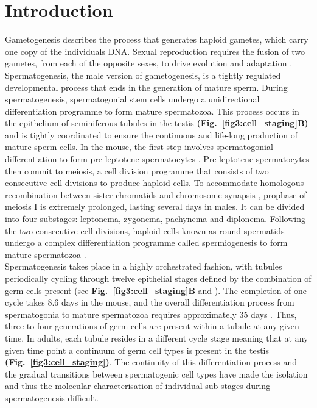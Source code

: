 
\section{Introduction}

Gametogenesis describes the process that generates haploid gametes, which carry one copy of the individuals DNA. 
Sexual reproduction requires the fusion of two gametes, from each of the opposite sexes, to drive evolution and adaptation \citep{McDonald2016}. 
Spermatogenesis, the male version of gametogenesis, is a tightly regulated developmental process that ends in the generation of mature sperm. During spermatogenesis, spermatogonial stem cells undergo a unidirectional differentiation programme to form mature spermatozoa. 
This process occurs in the epithelium of seminiferous tubules in the testis \textbf{(Fig.~\ref{fig3:cell_staging}B)} and is tightly coordinated to ensure the continuous and life-long production of mature sperm cells. 
In the mouse, the first step involves spermatogonial differentiation to form pre-leptotene spermatocytes \citep{Oakberg1971, DeRooij1973, DeRooij2000}. 
Pre-leptotene spermatocytes then commit to meiosis, a cell division programme that consists of two consecutive cell divisions to produce haploid cells. 
To accommodate homologous recombination between sister chromatids and chromosome synapsis \citep{Marston2004}, prophase of meiosis I is extremely prolonged, lasting several days in males. 
It can be divided into four substages: leptonema, zygonema, pachynema and diplonema. 
Following the two consecutive cell divisions, haploid cells known as round spermatids undergo a complex differentiation programme called spermiogenesis to form mature spermatozoa \citep{Oakberg1956}. \\

Spermatogenesis takes place in a highly orchestrated fashion, with tubules periodically cycling through twelve epithelial stages defined by the combination of germ cells present (see \textbf{Fig.~\ref{fig3:cell_staging}B} and \citep{Oakberg1956}). 
The completion of one cycle takes 8.6 days in the mouse, and the overall differentiation process from spermatogonia to mature spermatozoa requires approximately 35 days \citep{Oakberg1956a}. 
Thus, three to four generations of germ cells are present within a tubule at any given time. 
In adults, each tubule resides in a different cycle stage meaning that at any given time point a continuum of germ cell types is present in the testis \textbf{(Fig.~\ref{fig3:cell_staging})}. 
The continuity of this differentiation process and the gradual transitions between spermatogenic cell types have made the isolation and thus the molecular characterisation of individual sub-stages during spermatogenesis difficult.

